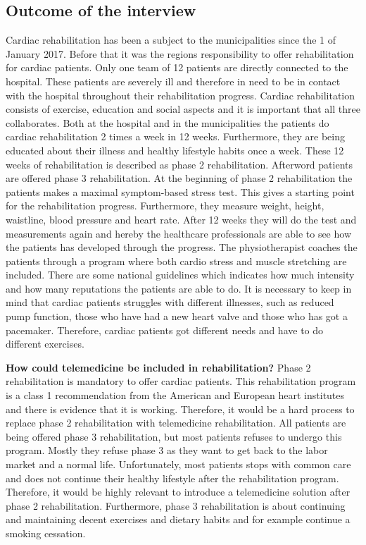 \subsection{Outcome of the interview} 
Cardiac rehabilitation has been a subject to the municipalities since the 1 of January 2017. Before that it was the regions responsibility to offer rehabilitation for cardiac patients. Only one team of 12 patients are directly connected to the hospital. These patients are severely ill and therefore in need to be in contact with the hospital throughout their rehabilitation progress. Cardiac rehabilitation consists of exercise, education and social aspects and it is important that all three collaborates. Both at the hospital and in the municipalities the patients do cardiac rehabilitation 2 times a week in 12 weeks. Furthermore, they are being educated about their illness and healthy lifestyle habits once a week. These 12 weeks of rehabilitation is described as phase 2 rehabilitation. Afterword patients are offered phase 3 rehabilitation. At the beginning of phase 2 rehabilitation the patients makes a maximal symptom-based stress test. This gives a starting point for the rehabilitation progress. Furthermore, they measure weight, height, waistline, blood pressure and heart rate. After 12 weeks they will do the test and measurements again and hereby the healthcare professionals are able to see how the patients has developed through the progress. The physiotherapist coaches the patients through a program where both cardio stress and muscle stretching are included. There are some national guidelines which indicates how much intensity and how many reputations the patients are able to do. It is necessary to keep in mind that cardiac patients struggles with different illnesses, such as reduced pump function, those who have had a new heart valve and those who has got a pacemaker. Therefore, cardiac patients got different needs and have to do different exercises.  

\textbf{How could telemedicine be included in rehabilitation?} \newline 
Phase 2 rehabilitation is mandatory to offer cardiac patients. This rehabilitation program is a class 1 recommendation from the American and European heart institutes and there is evidence that it is working. Therefore, it would be a hard process to replace phase 2 rehabilitation with telemedicine rehabilitation. All patients are being offered phase 3 rehabilitation, but most patients refuses to undergo this program. Mostly they refuse phase 3 as they want to get back to the labor market and a normal life. Unfortunately, most patients stops with common care and does not continue their healthy lifestyle after the rehabilitation program. Therefore, it would be highly relevant to introduce a telemedicine solution after phase 2 rehabilitation. Furthermore, phase 3 rehabilitation is about continuing and maintaining decent exercises and dietary habits and for example continue a smoking cessation. 


